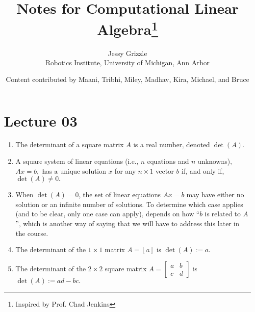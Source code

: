 \documentclass[letterpaper]{book}
\title{Notes for Computational Linear Algebra\thanks{Inspired by Prof. Chad Jenkins}}
\date{}
\author{Jessy Grizzle\\ Robotics Institute, University of Michigan, Ann Arbor
\and Content contributed by Maani, Tribhi, Miley, Madhav, Kira, Michael, and Bruce}
\begin{document}
\newtheorem{example}{Example}





\section{Lecture 03}

\begin{tcolorbox}[sharp corners, colback=green!30, colframe=green!80!blue, title=\textbf{\Large Enough Facts about the Determinant to Get Us Going}]
\begin{center}
\begin{minipage}{.95\textwidth}


\begin{enumerate}[label={\bf Fact~~}{\bf \arabic*}]
\setlength{\itemsep}{.5cm}
\Large

\item \label{item:determinantFact0}  The determinant of a square matrix $A$ is a real number, denoted $\det(A)$.

    \item \label{item:determinantFact1} A square system of linear equations (i.e.,  $n$ equations and $n$ unknowns), 
    $Ax=b,$
    has a unique solution $x$ for any $n\times 1$ vector $b$ if, and only if, $\det(A) \neq 0.$
    
     \item When $\det(A)=0$, the set of linear equations $Ax=b$ may have either no solution or an infinite number of solutions. To determine which case applies (and to be clear, only one case can apply), depends on how ``$b$ is related to $A$'', which is another way of saying that we will have to address this later in the course. 
     
     \item The determinant of the $1 \times 1$ matrix $A=[a]$ is $\det(A):=a$.
     
    \item The determinant of the $2 \times 2$ square matrix 
    $A=\left[\begin{array}{cc} a & b \\ c & d \end{array} \right]$ is
  $\det(A):= a d - bc.$

 
\end{enumerate}

\end{minipage}
\end{center}
\end{tcolorbox}
\end{document}

